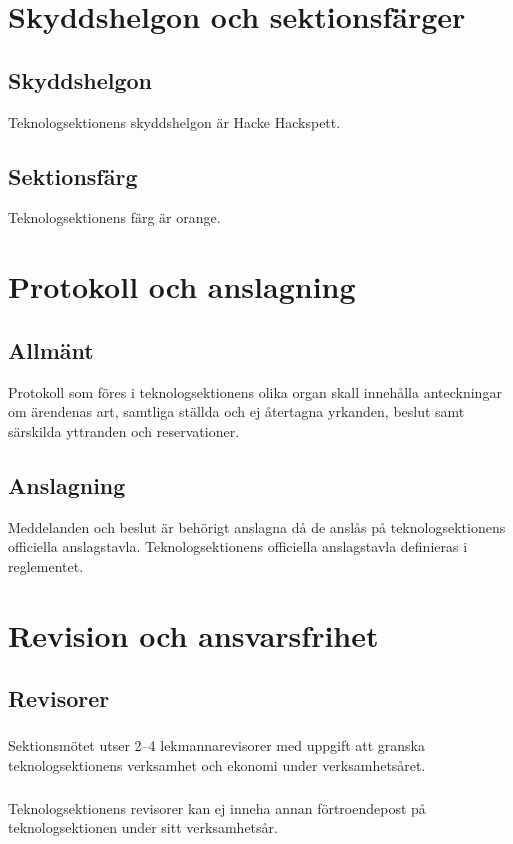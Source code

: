 \documentclass[a4paper]{dtek}
\begin{document}
\section{Skyddshelgon och sektionsfärger}
\subsection{Skyddshelgon}
Teknologsektionens skyddshelgon är Hacke Hackspett.
\subsection{Sektionsfärg}
Teknologsektionens färg är orange.
\newpage

\section{Protokoll och anslagning}
\subsection{Allmänt}
Protokoll som föres i teknologsektionens olika organ skall innehålla anteckningar om ärendenas art, samtliga ställda och ej återtagna yrkanden, beslut samt särskilda yttranden och reservationer.
\subsection{Anslagning}
Meddelanden och beslut är behörigt anslagna då de anslås på teknologsektionens
officiella anslagstavla. Teknologsektionens officiella anslagstavla definieras i
reglementet.
\newpage

\section{Revision och ansvarsfrihet}
\subsection{Revisorer}
\subsubsection{}
Sektionsmötet utser 2–4 lekmannarevisorer med uppgift att granska teknologsektionens verksamhet och ekonomi under verksamhetsåret.
\subsubsection{}
Teknologsektionens revisorer kan ej inneha annan förtroendepost på teknologsektionen under sitt verksamhetsår.
\end{document}
